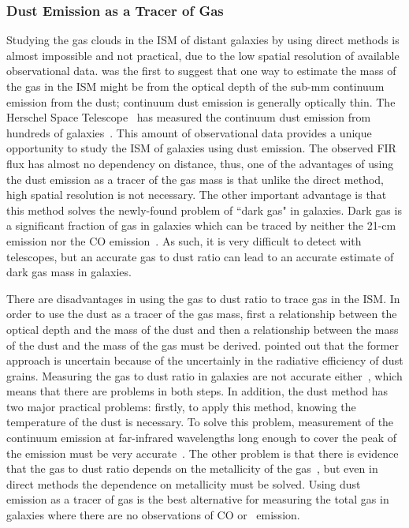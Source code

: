 \subsubsection{Dust Emission as a Tracer of Gas} 

Studying the gas clouds in the ISM of distant galaxies by using direct methods is almost impossible and not practical, due to the low spatial resolution of available observational data.
\cite{Hildebran83} was the first to suggest that one way to estimate the mass of the gas in the ISM might be from the optical depth of the sub-mm continuum emission from the dust; continuum dust emission is generally optically thin. 
The Herschel Space Telescope~\citep{Pilbratt10} has measured the continuum dust emission from hundreds of galaxies~\citep{Eales10, Oliver12}. 
This amount of observational data provides a unique opportunity to study the ISM of galaxies using dust emission. 
The observed FIR flux has almost no dependency on distance, thus, one of the advantages of using the dust emission as a tracer of the gas mass is that unlike the direct method, high spatial resolution is not necessary. 
The other important advantage is that this method solves the newly-found problem of ``dark gas" in galaxies. 
Dark gas is a significant fraction of gas in galaxies which can be traced by neither the 21-cm emission nor the CO emission~\citep{Abdo10}. 
As such, it is very difficult to detect with telescopes, but an accurate gas to dust ratio can lead to an accurate estimate of dark gas mass in galaxies. 

There are disadvantages in using the gas to dust ratio to trace gas in the ISM.
In order to use the dust as a tracer of the gas mass, first a relationship between the optical depth and the mass of the dust and then a relationship between the mass of the dust and the mass of the gas must be derived.
\cite{Draine03} pointed out that the former approach is uncertain because of the uncertainly in the radiative efficiency of dust grains. 
Measuring the gas to dust ratio in galaxies are not accurate either~\citep{Hildebran83}, which means that there are problems in both steps. 
In addition, the dust method has two major practical problems: firstly, to apply this method, knowing the temperature of the dust is necessary. 
To solve this problem, measurement of the continuum emission at far-infrared wavelengths long enough to cover the peak of the emission must be very accurate~\citep{Ealas12}. 
The other problem is that there is evidence that the gas to dust ratio depends on the metallicity of the gas~\citep{Lisenfeld98, Draine07}, but even in direct methods the dependence on metallicity must be solved. 
Using dust emission as a tracer of gas is the best alternative for measuring the total gas in galaxies where there are no observations of CO or \hi~emission. 

